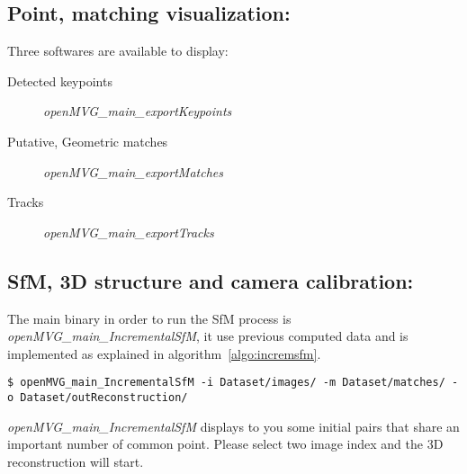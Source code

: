 \documentclass[11pt, letterpaper]{report}
\begin{document}
\subsection*{Point, matching visualization:}

Three softwares are available to display:
\begin{description}
\item[Detected keypoints] \textit{openMVG\_main\_exportKeypoints}
\item[Putative, Geometric matches] \textit{openMVG\_main\_exportMatches}
\item[Tracks] \textit{openMVG\_main\_exportTracks}
\end{description}

\subsection*{SfM, 3D structure and camera calibration:}

The main binary in order to run the SfM process is \textit{openMVG\_main\_IncrementalSfM}, it use previous computed data and is implemented as explained in algorithm~\ref{algo:incremsfm}.
\vspace{-.5cm}
\begin{lstlisting}
$ openMVG_main_IncrementalSfM -i Dataset/images/ -m Dataset/matches/ -o Dataset/outReconstruction/
\end{lstlisting}

\textit{openMVG\_main\_IncrementalSfM} displays to you some initial pairs that share an important number of common point. Please select two image index and the 3D reconstruction will start.



\end{document}
